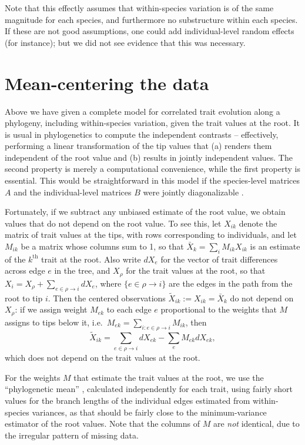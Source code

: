 \documentclass{article}
\begin{document}
Note that this effectly assumes that within-species variation is of the same magnitude for each species,
and furthermore no substructure within each species.
If these are not good assumptions, one could add individual-level random effects (for instance);
but we did not see evidence that this was necessary.


\section{Mean-centering the data}

Above we have given a complete model for correlated trait evolution along a phylogeny,
including within-species variation,
given the trait values at the root.
It is usual in phylogenetics to compute the independent contrasts -- 
effectively, performing a linear transformation of the tip values that (a) renders them independent of the root value
and (b) results in jointly independent values.
The second property is merely a computational convenience, while the first property is essential.
This would be straightforward in this model if the species-level matrices $A$ and the individual-level matrices $B$ were jointly diagonalizable 
\citep[as in][]{revell2009phylogenetic}.

Fortunately, if we subtract any unbiased estimate of the root value, we obtain values that do not depend on the root value.
To see this, let $X_{ik}$ denote the matrix of trait values at the tips, with rows corresponding to individuals, 
and let $M_{ik}$ be a matrix whose columns sum to 1, so that 
$\bar X_k = \sum_i M_{ik} X_{ik}$ is an estimate of the $k^\mathrm{th}$ trait at the root.
Also write $dX_e$ for the vector of trait differences across edge $e$ in the tree,
and $X_\rho$ for the trait values at the root,
so that $X_i = X_\rho + \sum_{e \in \rho \to i} dX_e$,
where $\{e \in \rho \to i\}$ are the edges in the path from the root to tip $i$.
Then the centered observations $\widetilde X_{ik} := X_{ik} = \bar X_k$ do not depend on $X_\rho$:
if we assign weight $M_{ek}$ to each edge $e$ proportional to the weights that $M$ assigns to tips below it,
i.e.\ $M_{ek} = \sum_{i : e \in \rho \to i} M_{ik}$, then
\begin{equation} \label{eqn:mean_centering}
  \widetilde X_{ik} = \sum_{e \in \rho \to i} dX_{ek} - \sum_e M_{ek} dX_{ek} ,
\end{equation}
which does not depend on the trait values at the root.

For the weights $M$ that estimate the trait values at the root,
we use the ``phylogenetic mean'' \citep{felsenstein1973maximumlikelihood},
calculated independently for each trait,
using fairly short values for the branch lengths of the individual edges estimated from within-species variances,
as that should be fairly close to the minimum-variance estimator of the root values.
Note that the columns of $M$ are \emph{not} identical,
due to the irregular pattern of missing data.
\end{document}

